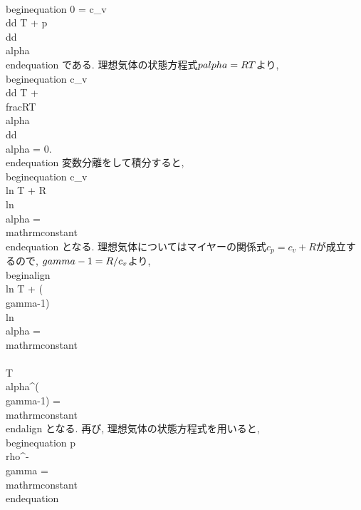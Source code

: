 \\begin{equation}
 0 = c_v\\dd T + p\\dd\\alpha
\\end{equation}
である. 理想気体の状態方程式$p\\alpha=RT$より,
\\begin{equation}
 c_v\\dd T + \\frac{RT}{\\alpha}\\dd\\alpha = 0.
\\end{equation}
変数分離をして積分すると,
\\begin{equation}
 c_v \\ln T + R\\ln\\alpha = \\mathrm{constant}
\\end{equation}
となる. 理想気体についてはマイヤーの関係式$c_p = c_v + R$が成立するので,
$\\gamma-1=R/c_v$より,
\\begin{align}
 \\ln T + (\\gamma-1)\\ln\\alpha = \\mathrm{constant} \\\\
 T\\alpha^{(\\gamma-1)} = \\mathrm{constant}
\\end{align}
となる. 再び, 理想気体の状態方程式を用いると,
\\begin{equation}
 p\\rho^{-\\gamma} = \\mathrm{constant}
\\end{equation}
